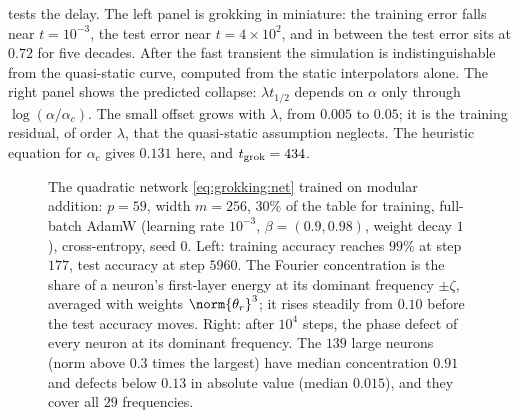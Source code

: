 \begin{refsection}
 tests the delay. The left panel is grokking in miniature: the training error falls near $t=10^{-3}$, the test error near $t=4\times10^2$, and in between the test error sits at $0.72$ for five decades. After the fast transient the simulation is indistinguishable from the quasi-static curve, computed from the static interpolators alone. The right panel shows the predicted collapse: $\lambda t_{1/2}$ depends on $\alpha$ only through $\log(\alpha/\alpha_c)$. The small offset grows with $\lambda$, from $0.005$ to $0.05$; it is the training residual, of order $\lambda$, that the quasi-static assumption neglects. The heuristic equation for $\alpha_c$ gives $0.131$ here, and $t_{\mathrm{grok}}=434$.

\begin{figure}[t]
\begin{fullwidth}
\centering
{}
\caption{The quadratic network \eqref{eq:grokking:net} trained on modular addition: $p=59$, width $m=256$, $30\%$ of the table for training, full-batch AdamW (learning rate $10^{-3}$, $\beta=(0.9,0.98)$, weight decay $1$), cross-entropy, seed $0$. Left: training accuracy reaches $99\%$ at step $177$, test accuracy at step $5960$. The Fourier concentration is the share of a neuron's first-layer energy at its dominant frequency $\pm\zeta$, averaged with weights $\norm{\theta_r}^3$; it rises steadily from $0.10$ before the test accuracy moves. Right: after $10^4$ steps, the phase defect of every neuron at its dominant frequency. The $139$ large neurons (norm above $0.3$ times the largest) have median concentration $0.91$ and defects below $0.13$ in absolute value (median $0.015$), and they cover all $29$ frequencies.}\label{fig:grokking:modadd}

\end{fullwidth}
\end{figure}
\end{refsection}
